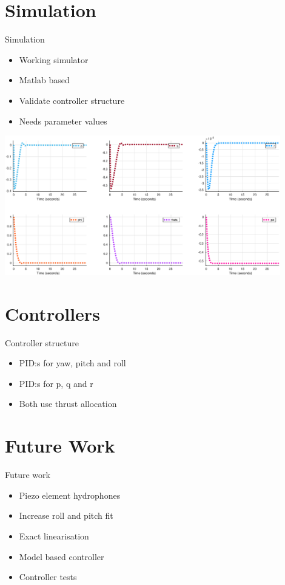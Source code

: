 \documentclass[11pt]{beamer}
\begin{document}
\section{Simulation}
\begin{frame}{Simulation}
\begin{itemize}
\item Working simulator
\item Matlab based
\item Validate controller structure
\item Needs parameter values
\end{itemize}
\includegraphics[width=0.9\textwidth]{fig/simulation.eps}
\end{frame}
\section{Controllers}
\begin{frame}{Controller structure}
\begin{itemize}
\item PID:s for yaw, pitch and roll
\item PID:s for p, q and r
\item Both use thrust allocation
\end{itemize}
\end{frame}
\section{Future Work}
\begin{frame}{Future work}
\begin{itemize}
\item Piezo element hydrophones
\item Increase roll and pitch fit
\item Exact linearisation
\item Model based controller
\item Controller tests
\end{itemize}

\end{frame}
\end{document}
